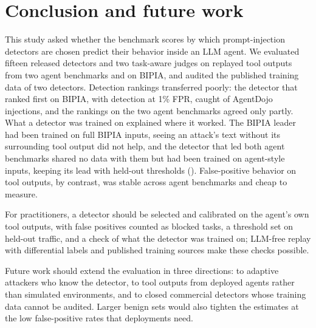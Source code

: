 \section{Conclusion and future work}
\label{sec:conclusion}
This study asked whether the benchmark scores by which prompt-injection detectors are chosen predict their behavior inside an LLM agent. We evaluated fifteen released detectors and two task-aware judges on replayed tool outputs from two agent benchmarks and on BIPIA, and audited the published training data of two detectors. Detection rankings transferred poorly: the detector that ranked first on BIPIA, with \BIPGTpr detection at 1\% FPR, caught \ADPGTpr of AgentDojo injections, and the rankings on the two agent benchmarks agreed only partly. What a detector was trained on explained where it worked. The BIPIA leader had been trained on full BIPIA inputs, seeing an attack's text without its surrounding tool output did not help, and the detector that led both agent benchmarks shared no data with them but had been trained on agent-style inputs, keeping its lead with held-out thresholds (\LoHZTpr). False-positive behavior on tool outputs, by contrast, was stable across agent benchmarks and cheap to measure.

For practitioners, a detector should be selected and calibrated on the agent's own tool outputs, with false positives counted as blocked tasks, a threshold set on held-out traffic, and a check of what the detector was trained on; LLM-free replay with differential labels and published training sources make these checks possible.

Future work should extend the evaluation in three directions: to adaptive attackers who know the detector, to tool outputs from deployed agents rather than simulated environments, and to closed commercial detectors whose training data cannot be audited. Larger benign sets would also tighten the estimates at the low false-positive rates that deployments need.
